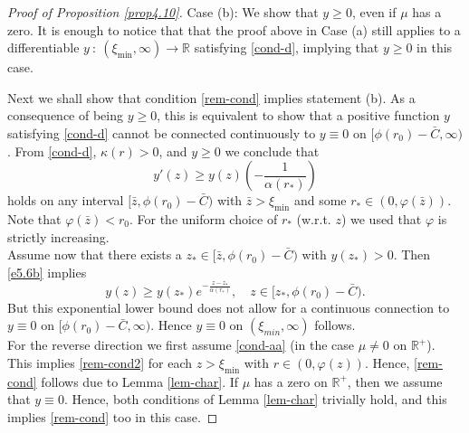 \documentclass[reqno]{amsart}
\newcommand{\R}{\mathbb{R}}
\begin{document}
\begin{proof}[Proof of Proposition \ref{prop4.10}]
Case (b): We show that $y\geq 0$, even if $\mu$ has a zero. It is enough to notice that that the proof above in Case (a) still applies to a differentiable $y\: :\:(\xi_{\min},\infty)\to\R$ satisfying \eqref{cond-d}, implying that $y\ge0$ in this case.

Next we shall show that condition \eqref{rem-cond} implies statement (b). As a consequence of being $y\geq 0$, this is equivalent to show that a positive function $y$ satisfying \eqref{cond-d} cannot be connected continuously to $y\equiv 0$ on $[\phi(r_0)-\bar C,\infty)$. From \eqref{cond-d}, $\kappa(r)>0$, and $y\ge0$ we conclude that
\begin{equation}\label{e5.6b}
  y'(z)\ge y(z)\left(-\frac1{\alpha(r_*)}\right)
\end{equation}
holds on any interval $[\bar z,\phi(r_0)-\bar C)$ with $\bar z>\xi_{\min}$ and some $r_*\in(0,\varphi(\bar z))$. Note that $\varphi(\bar z)<r_0$. For the uniform choice of $r_*$ (w.r.t. $z$) we used that $\varphi$ is strictly increasing.\\
\indent
Assume now that there exists a $z_*\in[\bar z,\phi(r_0)-\bar C)$ with $y(z_*)>0$. Then \eqref{e5.6b} implies 
$$
  y(z)\ge y(z_*)e^{-\frac{z-z_*}{\alpha(r_*)}},\quad 
  z\in[z_*,\phi(r_0)-\bar C).
$$
But this exponential lower bound does not allow for a continuous connection to $y\equiv0$ on $[\phi(r_0)-\bar C,\infty)$. Hence $y\equiv0$ on $(\xi_{min},\infty)$ follows.\\

For the reverse direction we first assume \eqref{cond-aa} (in the case $\mu\ne0$ on $\R^+$). This implies \eqref{rem-cond2} for each $z>\xi_{\min}$ with $r\in(0,\varphi(z))$. Hence, \eqref{rem-cond} follows due to Lemma \ref{lem-char}. If $\mu$ has a zero on $\R^+$, then we assume that $y\equiv 0$. Hence, both conditions of Lemma \ref{lem-char} trivially hold, and this implies \eqref{rem-cond} too in this case.
\end{proof}

\end{document}
